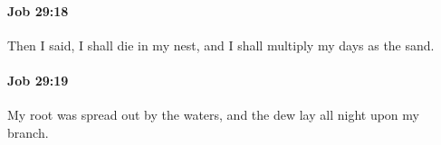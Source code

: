 		\paragraph{Job 29:18} %
			\label{JOB-29-18}

			Then I said, I shall die in my nest, and I shall multiply my days as the sand.


		\paragraph{Job 29:19} %
			\label{JOB-29-19}

			My root was spread out by the waters, and the dew lay all night upon my branch.


